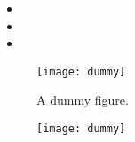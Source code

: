 \documentclass[]{ccdsexam}
\begin{document}
\begin{questions}


\question \lipsum[1][1]



\question[25] \lipsum[1][1-3]

\begin{itemize}
  \item \lipsum[2][1]
  \item \lipsum[2][2]
  \item \lipsum[2][3]
\end{itemize}

\lipsum[1][4-6]
\droppoints

\begin{figure}[ht]
%
  \centering
  \texttt{[image: dummy]}
  \caption{A dummy figure.}\label{fig:test}
\end{figure}

\begin{figure}[ht]
  \centering
  \texttt{[image: dummy]}
  \caption{}
\end{figure}


\end{questions}
\end{document}
